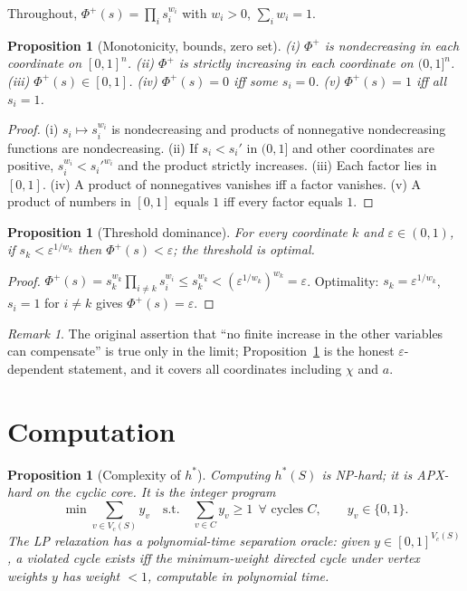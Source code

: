 \documentclass[11pt]{article}
\newtheorem{proposition}[theorem]{Proposition}
\theoremstyle{definition}
\theoremstyle{remark}
\newtheorem{remark}[theorem]{Remark}
\newcommand{\Ph}{\Phi^{+}}
\newcommand{\eps}{\varepsilon}
\begin{document}
Throughout, $\Ph(s)=\prod_i s_i^{w_i}$ with $w_i>0$, $\sum_i w_i=1$.

\begin{proposition}[Monotonicity, bounds, zero set]\label{prop:mono}
(i) $\Ph$ is nondecreasing in each coordinate on $[0,1]^n$. (ii) $\Ph$ is strictly increasing in each coordinate on $(0,1]^n$. (iii) $\Ph(s)\in[0,1]$. (iv) $\Ph(s)=0$ iff some $s_i=0$. (v) $\Ph(s)=1$ iff all $s_i=1$.
\end{proposition}

\begin{proof}
(i) $s_i\mapsto s_i^{w_i}$ is nondecreasing and products of nonnegative nondecreasing functions are nondecreasing. (ii) If $s_i<s_i'$ in $(0,1]$ and other coordinates are positive, $s_i^{w_i}<s_i'^{w_i}$ and the product strictly increases. (iii) Each factor lies in $[0,1]$. (iv) A product of nonnegatives vanishes iff a factor vanishes. (v) A product of numbers in $[0,1]$ equals $1$ iff every factor equals $1$.
\end{proof}

\begin{proposition}[Threshold dominance]\label{prop:thresh}
For every coordinate $k$ and $\eps\in(0,1)$, if $s_k<\eps^{1/w_k}$ then $\Ph(s)<\eps$; the threshold is optimal.
\end{proposition}

\begin{proof}
$\Ph(s)=s_k^{w_k}\prod_{i\ne k}s_i^{w_i}\le s_k^{w_k}<(\eps^{1/w_k})^{w_k}=\eps$. Optimality: $s_k=\eps^{1/w_k}$, $s_i=1$ for $i\ne k$ gives $\Ph(s)=\eps$.
\end{proof}

\begin{remark}
The original assertion that ``no finite increase in the other variables can compensate'' is true only in the limit; Proposition~\ref{prop:thresh} is the honest $\eps$-dependent statement, and it covers all coordinates including $\chi$ and $a$.
\end{remark}

\section{Computation}\label{sec:comp}

\begin{proposition}[Complexity of $h^*$]\label{prop:comp}
Computing $h^*(S)$ is NP-hard; it is APX-hard on the cyclic core. It is the integer program
\[
\min\sum_{v\in V_c(S)} y_v \quad\text{s.t.}\quad \sum_{v\in C} y_v\ge 1\ \ \forall\text{ cycles } C,\qquad y_v\in\{0,1\}.
\]
The LP relaxation has a polynomial-time separation oracle: given $y\in[0,1]^{V_c(S)}$, a violated cycle exists iff the minimum-weight directed cycle under vertex weights $y$ has weight $<1$, computable in polynomial time.
\end{proposition}
\end{document}

